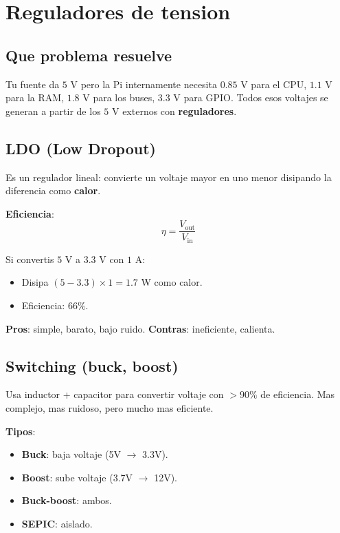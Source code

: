 \documentclass[11pt,a4paper,oneside,openright]{book}
\begin{document}
\chapter{Reguladores de tension}

\section{Que problema resuelve}

Tu fuente da $5$ V pero la Pi internamente necesita $0.85$ V para el CPU,
$1.1$ V para la RAM, $1.8$ V para los buses, $3.3$ V para GPIO. Todos esos
voltajes se generan a partir de los $5$ V externos con \textbf{reguladores}.

\section{LDO (Low Dropout)}

Es un regulador lineal: convierte un voltaje mayor en uno menor disipando
la diferencia como \textbf{calor}.

\textbf{Eficiencia}:
\begin{equation}
\eta = \frac{V_{\text{out}}}{V_{\text{in}}}
\end{equation}

Si convertis $5$ V a $3.3$ V con $1$ A:
\begin{itemize}[leftmargin=2em]
  \item Disipa $(5 - 3.3) \times 1 = 1.7$ W como calor.
  \item Eficiencia: $66\%$.
\end{itemize}

\textbf{Pros}: simple, barato, bajo ruido.
\textbf{Contras}: ineficiente, calienta.

\section{Switching (buck, boost)}

Usa inductor + capacitor para convertir voltaje con $> 90\%$ de eficiencia.
Mas complejo, mas ruidoso, pero mucho mas eficiente.

\textbf{Tipos}:
\begin{itemize}[leftmargin=2em]
  \item \textbf{Buck}: baja voltaje (5V $\to$ 3.3V).
  \item \textbf{Boost}: sube voltaje (3.7V $\to$ 12V).
  \item \textbf{Buck-boost}: ambos.
  \item \textbf{SEPIC}: aislado.
\end{itemize}
\end{document}
